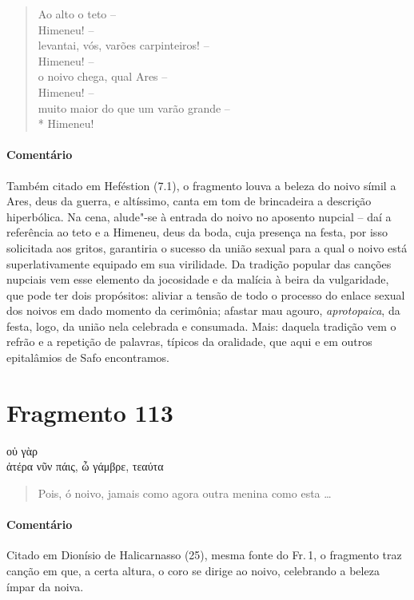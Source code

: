 {\begin{verse}
Ao alto o teto -- \\
Himeneu! -- \\
levantai, vós, varões carpinteiros! -- \\
Himeneu! -- \\
o noivo chega, qual Ares -- \\
Himeneu! -- \\ \EP[2]
muito maior do que um varão grande --\\*
Himeneu!
\end{verse}

\medskip

{\paragraph{Comentário} Também citado em Heféstion (7.1), o fragmento louva a beleza do noivo símil a Ares,
deus da guerra, e altíssimo, canta em tom de brincadeira a descrição
hiperbólica. Na cena, alude"-se à entrada do noivo no aposento nupcial -- daí a
referência ao teto e a Himeneu, deus da boda, cuja presença na festa, por isso
solicitada aos gritos, garantiria o sucesso da união sexual para a qual o noivo está superlativamente equipado em sua virilidade. Da tradição popular das canções nupciais vem esse elemento da jocosidade e da malícia à beira da vulgaridade, que pode ter dois propósitos: aliviar a tensão de todo o processo do enlace sexual dos noivos em dado momento da cerimônia; afastar mau agouro, \textit{aprotopaica}, da festa, logo, da união nela celebrada e consumada. Mais: daquela tradição vem o refrão e a repetição de palavras, típicos da oralidade, que aqui e em outros epitalâmios de Safo encontramos.}


\section{Fragmento 113}

\begin{gkverse}
  οὐ γὰρ\\
ἀτέρα νῦν πάις, ὦ γάμβρε, τεαύτα
\end{gkverse}

\begin{verse}
Pois, ó noivo, jamais como agora outra menina como esta \ldots{}
\end{verse}

\medskip

{\paragraph{Comentário} Citado em Dionísio de Halicarnasso (25), mesma fonte do Fr.\,1, o fragmento traz canção em que, a certa altura, o coro se dirige ao noivo, celebrando a beleza ímpar da noiva.}


}
